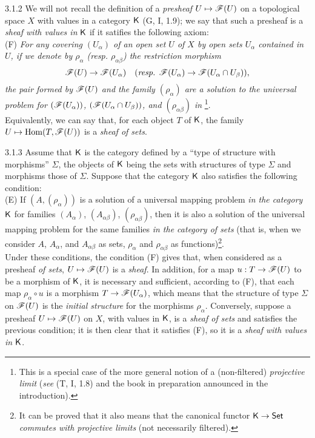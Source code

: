 \begin{env}{3.1.2}
\label{env-0.3.1.2}
We will not recall the definition of a \emph{presheaf} $U\mapsto\mathscr{F}(U)$ on a
topological space $X$ with values in a category $\mathsf{K}$ (G, I, 1.9); we say that
such a presheaf is a \emph{sheaf with values in} $\mathsf{K}$ if it satifies the
following axiom:\\

(F) \emph{For any covering $(U_\alpha)$ of an open set $U$ of $X$ by open sets
    $U_\alpha$ contained in $U$, if we denote by $\rho_\alpha$
    (resp. $\rho_{\alpha\beta}$) the restriction morphism}
    \[
      \mathscr{F}(U)\to\mathscr{F}(U_\alpha)
      \quad
      (\text{\emph{resp. }}\mathscr{F}(U_\alpha)\to\mathscr{F}(U_\alpha\cap U_\beta)),
    \]
    \emph{the pair formed by $\mathscr{F}(U)$ and the family $(\rho_\alpha)$ are a
    solution to the universal problem for $(\mathscr{F}(U_\alpha))$,
    $(\mathscr{F}(U_\alpha\cap U_\beta))$, and $(\rho_{\alpha\beta})$ in
    }\footnote{This is a special case of the more general
    notion of a (non-filtered) \emph{projective limit} (\emph{see} (T, I, 1.8)
    and the book in preparation announced in the introduction).}.\\

Equivalently, we can say that, for each object $T$ of $\mathsf{K}$, the family
$U\mapsto{\mathop{\mathrm{Hom}}\nolimits}(T,\mathscr{F}(U))$ is a \emph{sheaf of sets}.
\end{env}

\begin{env}{3.1.3}
\label{env-0.3.1.3}
Assume that $\mathsf{K}$ is the category defined by a
``type of structure with morphisms'' $\Sigma$, the objects of $\mathsf{K}$ being the
sets with structures of type $\Sigma$ and morphisms those of $\Sigma$. Suppose
that the category $\mathsf{K}$ also satisfies the following condition:\\

(E) If $(A,(\rho_\alpha))$ is a solution of a universal mapping problem \emph{in
    the category $\mathsf{K}$} for families $(A_\alpha)$, $(A_{\alpha\beta})$,
    $(\rho_{\alpha\beta})$, then it is also a solution of the universal mapping
    problem for the same families \emph{in the category of sets} (that is, when
    we consider $A$, $A_\alpha$, and $A_{\alpha\beta}$ as sets, $\rho_\alpha$
    and $\rho_{\alpha\beta}$ as functions)\footnote{It can be proved that it
    also means that the canonical functor $\mathsf{K}\to\mathsf{Set}$ \emph{commutes with
    projective limits} (not necessarily filtered).}.\\

Under these conditions, the condition (F) gives that, when considered as a
presheaf \emph{of sets}, $U\mapsto\mathscr{F}(U)$ is a \emph{sheaf}. In addition, for
a map $u:T\to\mathscr{F}(U)$ to be a morphism of $\mathsf{K}$, it is necessary and
sufficient, according to (F), that each map $\rho_\alpha\circ u$ is a morphism
$T\to\mathscr{F}(U_\alpha)$, which means that the structure of type $\Sigma$ on
$\mathscr{F}(U)$ is the \emph{initial structure} for the morphisms $\rho_\alpha$.
Conversely, suppose a presheaf $U\mapsto\mathscr{F}(U)$ on $X$, with values in $\mathsf{K}$,
is a \emph{sheaf of sets} and satisfies the previous condition; it is then clear
that it satisfies (F), so it is a \emph{sheaf with values in $\mathsf{K}$}.
\end{env}

